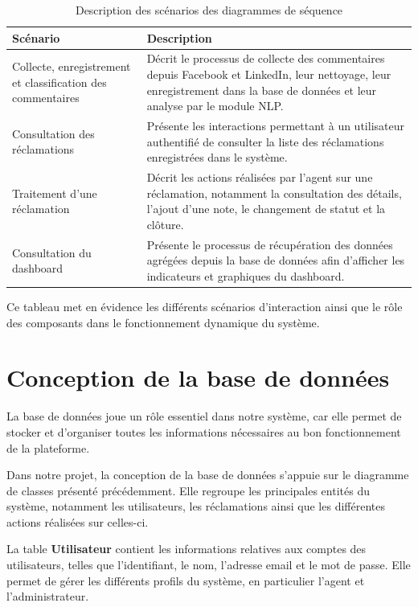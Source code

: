 \documentclass[12pt,a4paper,oneside]{report}
\begin{document}
\begin{table}[H]
\centering
\small
\caption{Description des scénarios des diagrammes de séquence}
\label{tab:seq}
\begin{tabular}{|p{4.5cm}|p{9cm}|}
\hline
\textbf{Scénario} & \textbf{Description} \\
\hline
Collecte, enregistrement et classification des commentaires & Décrit le processus de collecte des commentaires depuis Facebook et LinkedIn, leur nettoyage, leur enregistrement dans la base de données et leur analyse par le module NLP. \\
\hline
Consultation des réclamations & Présente les interactions permettant à un utilisateur authentifié de consulter la liste des réclamations enregistrées dans le système. \\
\hline
Traitement d’une réclamation & Décrit les actions réalisées par l’agent sur une réclamation, notamment la consultation des détails, l’ajout d’une note, le changement de statut et la clôture. \\
\hline
Consultation du dashboard & Présente le processus de récupération des données agrégées depuis la base de données afin d’afficher les indicateurs et graphiques du dashboard. \\
\hline
\end{tabular}
\end{table}

Ce tableau met en évidence les différents scénarios d’interaction ainsi que le rôle des composants dans le fonctionnement dynamique du système.
\FloatBarrier

\section{Conception de la base de données}

La base de données joue un rôle essentiel dans notre système, car elle permet de stocker et d’organiser toutes les informations nécessaires au bon fonctionnement de la plateforme.

Dans notre projet, la conception de la base de données s’appuie sur le diagramme de classes présenté précédemment. Elle regroupe les principales entités du système, notamment les utilisateurs, les réclamations ainsi que les différentes actions réalisées sur celles-ci.

La table \textbf{Utilisateur} contient les informations relatives aux comptes des utilisateurs, telles que l’identifiant, le nom, l’adresse email et le mot de passe. Elle permet de gérer les différents profils du système, en particulier l’agent et l’administrateur.
\end{document}
